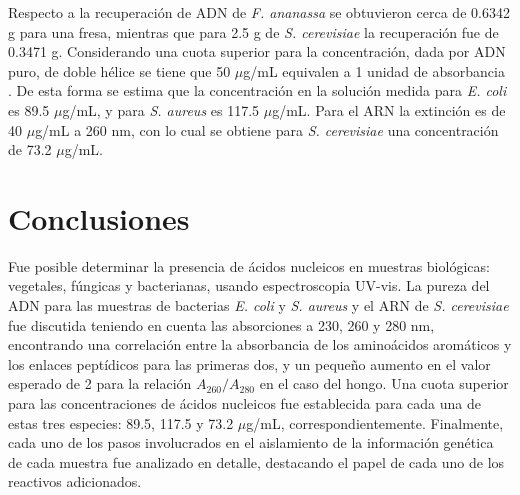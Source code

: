 \documentclass[fleqn,10pt]{SelfArx}
\begin{document}
	Respecto a la recuperación de ADN de \textit{F. ananassa} se obtuvieron cerca de 0.6342 g para una fresa, mientras que para 2.5 g de \textit{S. cerevisiae} la recuperación fue de 0.3471 g. Considerando una cuota superior para la concentración, dada por ADN puro, de doble hélice se tiene que 50 $\mu$g/mL equivalen a 1 unidad de absorbancia \cite{sambrook2001molecular}. De esta forma se estima que la concentración en la solución medida para \textit{E. coli} es 89.5 $\mu$g/mL, y para \textit{S. aureus} es 117.5 $\mu$g/mL. Para el ARN la extinción es de 40 $\mu$g/mL a 260 nm, con lo cual se obtiene para \textit{S. cerevisiae} una concentración de 73.2 $\mu$g/mL.
	
\section{Conclusiones}
	Fue posible determinar la presencia de ácidos nucleicos en muestras biológicas: vegetales, fúngicas y bacterianas, usando espectroscopia UV-vis. La pureza del ADN para las muestras de bacterias \textit{E. coli} y \textit{S. aureus} y el ARN de	\textit{S. cerevisiae} fue discutida teniendo en cuenta las absorciones a 230, 260 y 280 nm, encontrando una correlación entre la absorbancia de los aminoácidos aromáticos y los enlaces peptídicos para las primeras dos, y un pequeño aumento en el valor esperado de 2 para la relación $A_{260} / A_{280}$ en el caso del hongo. Una cuota superior para las concentraciones de ácidos nucleicos fue establecida para cada una de estas tres especies: 89.5, 117.5 y 73.2 $\mu$g/mL, correspondientemente. Finalmente, cada uno de los pasos involucrados en el aislamiento de la información genética de cada muestra fue analizado en detalle, destacando el papel de cada uno de los reactivos adicionados.
	



\end{document}
